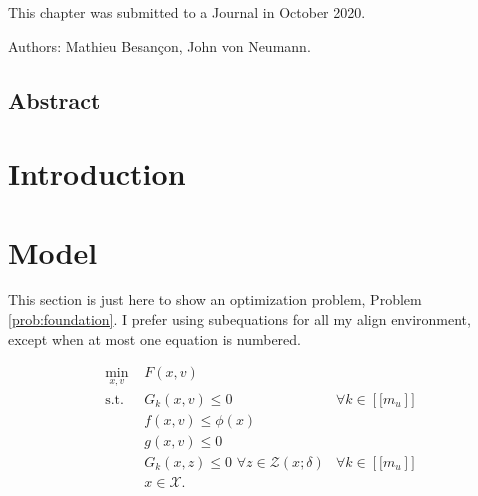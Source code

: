 
\label{chap:NORBiP}

This chapter was submitted to a Journal in October 2020.

Authors: Mathieu Besançon, John von Neumann.

\subsection*{Abstract}

\section{Introduction}

\section{Model}
This section is just here to show an optimization problem, Problem \eqref{prob:foundation}.
I prefer using {subequations} for all my align environment, except when at
most one equation is numbered.

\begin{subequations}\label{prob:foundation}
\begin{align}
\min_{x,v}\,\, & F(x,v)\label{eq:NORBiPobj}\\
\text{s.t.} \,\, & G_k(x,v) \leq 0 &\forall k \in \left[\![m_u\right]\!]\label{eq:redundant} \\
& f(x,v) \leq \phi(x)\\
& g(x, v) \leq 0\\
& G_k(x,z) \leq 0\,\, \forall z \in \mathcal{Z}(x;\delta) &\forall k \in \left[\![m_u\right]\!]\label{eq:robcons}\\
& x \in \mathcal{X}.\label{eq:foundationlast}
\end{align}
\end{subequations}
